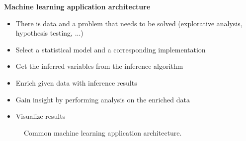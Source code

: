\documentclass[a4paper, 11pt, titlepage]{scrartcl}
\begin{document}
\textbf{Machine learning application architecture}
\begin{itemize}
\item There is data and a problem that needs to be solved (explorative analysis, hypothesis testing, ...)
\item Select a statistical model and a corresponding implementation
\item Get the inferred variables from the inference algorithm
\item Enrich given data with inference results
\item Gain insight by performing analysis on the enriched data
\item Visualize results
\end{itemize}

\begin{figure}
\resizebox{1\linewidth}{!}{}
\caption{Common machine learning application architecture.}\label{fig:ml-application-architecture}
\end{figure}
\end{document}

